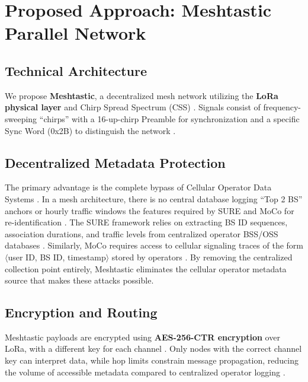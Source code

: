 \section{Proposed Approach: Meshtastic Parallel Network}\label{sec:our_approach}
\subsection{Technical Architecture}
We propose \textbf{Meshtastic}, a decentralized mesh network utilizing the \textbf{LoRa physical layer} and Chirp Spread Spectrum (CSS) \cite{meshtastic_overview}. Signals consist of frequency-sweeping ``chirps'' with a 16-up-chirp Preamble for synchronization and a specific Sync Word (0x2B) to distinguish the network \cite{meshtastic_overview}.

\subsection{Decentralized Metadata Protection}
The primary advantage is the complete bypass of Cellular Operator Data Systems \cite{meshtastic_overview}. In a mesh architecture, there is no central database logging ``Top 2 BS'' anchors or hourly traffic windows the features required by SURE and MoCo for re-identification \cite{duan2025sure, duan2025moco, meshtastic_overview}. The SURE framework relies on extracting BS ID sequences, association durations, and traffic levels from centralized operator BSS/OSS databases \cite{duan2025sure}. Similarly, MoCo requires access to cellular signaling traces of the form $\langle$user ID, BS ID, timestamp$\rangle$ stored by operators \cite{duan2025moco}. By removing the centralized collection point entirely, Meshtastic eliminates the cellular operator metadata source that makes these attacks possible.

\subsection{Encryption and Routing}
Meshtastic payloads are encrypted using \textbf{AES-256-CTR encryption} over LoRa, with a different key for each channel \cite{meshtastic_overview}. Only nodes with the correct channel key can interpret data, while hop limits constrain message propagation, reducing the volume of accessible metadata compared to centralized operator logging \cite{meshtastic_overview}.

